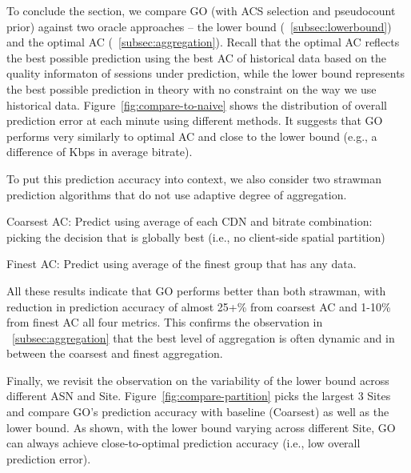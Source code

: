 \label{subsec:minieval}

To conclude the section, we compare GO (with ACS selection and pseudocount prior) against two oracle approaches -- the lower bound (\Section~\ref{subsec:lowerbound}) and the optimal AC (\Section~\ref{subsec:aggregation}).  Recall that the optimal AC reflects the best possible prediction using the best AC of historical data based on the quality informaton of sessions under prediction, while the lower bound represents the best possible prediction in theory with no constraint on the way we use historical data. Figure~\ref{fig:compare-to-naive} shows the distribution of overall prediction error at each minute using different methods. It suggests that GO performs very similarly to optimal AC and close to the lower bound (e.g., a difference of \fillme Kbps in average bitrate). 

To put this prediction accuracy into context, we also consider two strawman prediction algorithms that do not use adaptive degree of aggregation.
\begin{packeditemize}
	\item Coarsest AC: Predict using average of each CDN and bitrate combination: picking the decision that is globally best (i.e., no client-side spatial partition)
	\item Finest AC: Predict using average of the finest group that has any data.
\end{packeditemize}

All these results indicate that GO performs better than both strawman, with reduction in prediction accuracy of almost 25+\% from coarsest AC and 1-10\% from finest AC all four metrics. This confirms the observation in \Section~\ref{subsec:aggregation} that the best level of aggregation is often dynamic and in between the coarsest and finest aggregation.


Finally, we revisit the observation on the variability of the lower bound across different ASN and Site. Figure~\ref{fig:compare-partition} picks the largest 3 Sites and compare GO's prediction accuracy with baseline (Coarsest) as well as the lower bound. As shown, with the lower bound varying across different Site, GO can always achieve close-to-optimal prediction accuracy (i.e., low overall prediction error).

